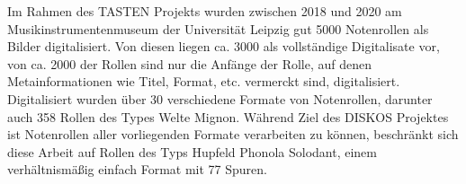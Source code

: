 Im Rahmen des TASTEN Projekts wurden zwischen 2018 und 2020 am Musikinstrumentenmuseum der Universität Leipzig gut 5000 Notenrollen als Bilder digitalisiert.
Von diesen liegen ca. 3000 als vollständige Digitalisate vor, von ca. 2000 der Rollen sind nur die Anfänge der Rolle, auf denen Metainformationen wie Titel, Format, etc. vermerckt sind, digitalisiert.
Digitalisiert wurden über 30 verschiedene Formate von Notenrollen, darunter auch 358 Rollen des Types Welte Mignon.
Während Ziel des DISKOS Projektes ist Notenrollen aller vorliegenden Formate verarbeiten zu können, beschränkt sich diese Arbeit auf Rollen des Typs Hupfeld Phonola Solodant, einem verhältnismäßig einfach Format mit 77 Spuren.